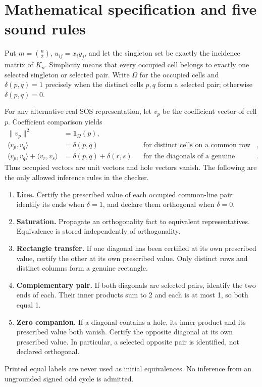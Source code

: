 \documentclass[11pt]{article}
\begin{document}
\newpage
\section{Mathematical specification and five sound rules}
Put $m=\binom n2$, $u_{ij}=x_i y_j$, and let the singleton set be exactly the
incidence matrix of $K_n$. Simplicity means that every occupied cell belongs
to exactly one selected singleton or selected pair. Write $\Omega$ for the
occupied cells and $\delta(p,q)=1$ precisely when the distinct cells $p,q$
form a selected pair; otherwise $\delta(p,q)=0$.

For any alternative real SOS representation, let $v_p$ be the coefficient
vector of cell $p$. Coefficient comparison yields
\begin{align*}
 \|v_p\|^2&=\mathbf 1_\Omega(p),\\
 \langle v_p,v_q\rangle&=\delta(p,q)
       &&\text{for distinct cells on a common row or column},\\
 \langle v_p,v_q\rangle+\langle v_r,v_s\rangle
       &=\delta(p,q)+\delta(r,s)
       &&\text{for the diagonals of a genuine rectangle}.
\end{align*}
Thus occupied vectors are unit vectors and hole vectors vanish. The following
are the only allowed inference rules in the checker.
\begin{enumerate}
\item \textbf{Line.} Certify the prescribed value of each occupied common-line
pair: identify its ends when $\delta=1$, and declare them orthogonal when
$\delta=0$.
\item \textbf{Saturation.} Propagate an orthogonality fact to equivalent
representatives. Equivalence is stored independently of orthogonality.
\item \textbf{Rectangle transfer.} If one diagonal has been certified at its
own prescribed value, certify the other at its own prescribed value. Only
distinct rows and distinct columns form a genuine rectangle.
\item \textbf{Complementary pair.} If both diagonals are selected pairs,
identify the two ends of each. Their inner products sum to 2 and each is at
most 1, so both equal 1.
\item \textbf{Zero companion.} If a diagonal contains a hole, its inner
product and its prescribed value both vanish. Certify the opposite diagonal
at its own prescribed value. In particular, a selected opposite pair is
identified, not declared orthogonal.
\end{enumerate}
Printed equal labels are never used as initial equivalences. No inference
from an ungrounded signed odd cycle is admitted.
\end{document}
